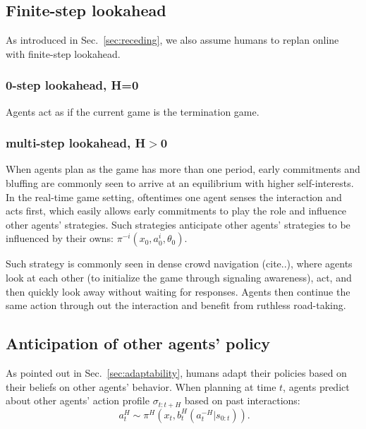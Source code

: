 \documentclass[letterpaper, 10 pt, conference]{ieeeconf}  %
\begin{document}
\subsection{Finite-step lookahead}
As introduced in Sec.~\ref{sec:receding}, we also assume humans to replan 
online with finite-step lookahead. 
\subsubsection{0-step lookahead, H=0}
Agents act as if the current game is the termination game. 

\subsubsection{multi-step lookahead, H$>$0}
When agents plan as the game has more than one period, early commitments and 
bluffing are commonly seen to arrive at an equilibrium with higher 
self-interests. In the real-time game setting, oftentimes one agent senses the 
interaction and acts first, which easily allows early commitments to play the 
role and influence other agents' strategies. Such strategies anticipate other 
agents' strategies to be influenced by their owns: 
$\pi^{-i}(x_0,a^i_0,\theta_0)$. 

Such strategy is commonly seen in dense crowd navigation (cite..), where agents look at each other (to initialize the game through signaling awareness), act, and then quickly look away without waiting for responses. Agents then continue the same action through out the interaction and benefit from ruthless road-taking.


\subsection{Anticipation of other agents' policy}
As pointed out in Sec.~\ref{sec:adaptability}, humans adapt their policies 
based on their beliefs on other agents' behavior.
When planning at time $t$, agents predict about other agents' 
action profile $\sigma_{t:t+H}$ based on past interactions:
\begin{equation}~\label{eq:human_decision1}
a^H_t \sim \pi^H(x_t, b^H_t(a^{-H}_{t}|s_{0:t})).
\end{equation}
\end{document}
